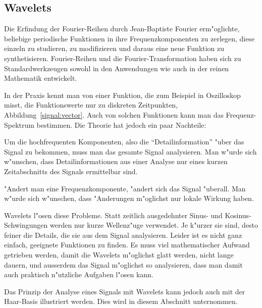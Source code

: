 \subsection{Wavelets\label{subsection-wavelets}}
Die Erfindung der Fourier-Reihen durch Jean-Baptiste Fourier erm"oglichte,
beliebige periodische Funktionen in ihre Frequenzkomponenten zu zerlegen,
diese einzeln zu studieren, zu modifizieren und daraus eine neue Funktion
zu synthetisieren. Fourier-Reihen und die Fourier-Transformation haben
sich zu Standardwerkzeugen sowohl in den Anwendungen wie auch in der
reinen Mathematik entwickelt.

In der Praxis kennt man von einer Funktion, die zum Beispiel in
Oszilloskop misst, die Funktionswerte nur zu diskreten Zeitpunkten,
Abbildung~\ref{signal:vector}.
Auch von solchen Funktionen kann man das Frequenz-Spektrum bestimmen.
Die Theorie hat jedoch ein paar Nachteile:
\begin{compactenum}
\item Um die hochfrequenten Komponenten, also die ``Detailinformation''
"uber das Signal zu bekommen, muss man das gesamte Signal analysieren.
Man w"urde sich w"unschen, dass Detailinformationen aus einer Analyse
nur eines kurzen Zeitabschnitts des Signals ermittelbar sind.
\item "Andert man eine Frequenzkomponente, "andert sich das Signal
"uberall. Man w"urde sich w"unschen, dass "Anderungen m"oglichst nur
lokale Wirkung haben.
\end{compactenum}
Wavelets l"osen diese Probleme. Statt zeitlich ausgedehnter Sinus-
und Kosinus-Schwingungen werden nur kurze Wellenz"uge verwendet.
Je k"urzer sie sind, desto feiner die Details, die sie aus dem 
Signal analysieren. Leider ist es nicht ganz einfach, geeignete
Funktionen zu finden. Es muss viel mathematischer Aufwand getrieben
werden, damit die Wavelets m"oglichst glatt werden, nicht lange
dauern, und ausserdem das Signal m"oglichst so analysieren, dass
man damit auch praktisch n"utzliche Aufgaben l"osen kann.

Das Prinzip der Analyse eines Signals mit Wavelets kann jedoch
auch mit der Haar-Basis illustriert werden. Dies wird in diesem
Abschnitt unternommen.

